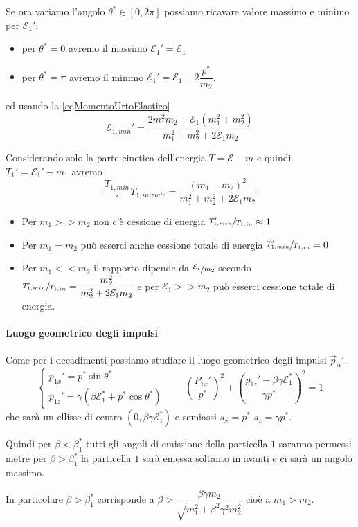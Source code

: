 \documentclass[12pt,a4paper,titlepage, twoside, openright]{book}
\numberwithin{equation}{chapter}
\begin{document}
Se ora variamo l'angolo $\theta^*\in[0,2\pi]$ possiamo ricavare valore massimo e minimo per $\mathcal{E}_1'$:\begin{itemize} \item per $\theta^*=0$ avremo il massimo $\mathcal{E}_1'=\mathcal{E}_1$ \item per $\theta^*=\pi$ avremo il minimo $\mathcal{E}_1'=\mathcal{E}_1-2\dfrac{p^*}{m_2}$.
\end{itemize}
ed usando la \eqref{eqMomentoUrtoElastico} 
\[
\mathcal{E}_{1,min}'=\dfrac{2m_1^2m_2+\mathcal{E}_1(m_1^2+m_2^2)}{m_1^2+m_2^2+2\mathcal{E}_1m_2}
\]

Considerando solo la parte cinetica dell'energia $T=\mathcal{E}-m$ e quindi $T_1'=\mathcal{E}_1'-m_1$ avremo
\[
\dfrac{T_{1,min}}'{T_{1,iniziale}}=\dfrac{(m_1-m_2)^2}{m_1^2+m_2^2+2\mathcal{E}_1m_2}
\]
\begin{itemize}
\item Per $m_1>>m_2$ non c'è cessione di energia $\sfrac{T_{1,min}'}{T_{1,in}}\approx 1$ 
\item Per $m_1=m_2$ può esserci anche cessione totale di energia $\sfrac{T_{1,min}'}{T_{1,in}}=0$
\item Per $m_1<<m_2$ il rapporto dipende da $\sfrac{\mathcal{E}_1}{m_2}$ secondo  $\sfrac{T_{1,min}'}{T_{1,in}}=\dfrac{m_2^2}{m_2^2+2\mathcal{E}_1m_2}$ e per $\mathcal{E}_1>>m_2$ può esserci cessione totale di energia.
\end{itemize}

\paragraph{Luogo geometrico degli impulsi}
Come per i decadimenti possiamo studiare il luogo geometrico degli impulsi $\vec{p}_\alpha'$.
\[
\begin{cases} p_{1x}'=p^*\sin{\theta^*} \\ p_{1z}'=\gamma\left( \beta\mathcal{E}_1^*+p^*\cos{\theta^*} \right)
\end{cases} \qquad \left(\dfrac{P_{1x}'}{p^*}\right)^2+\left(\dfrac{p_{1z}'-\beta\gamma\mathcal{E}_1^*}{\gamma p^*}\right)^2 =1
\] 
che sarà un ellisse di centro $(0,\beta\gamma\mathcal{E}_1^*)$ e semiassi $s_x=p^*$ $s_z=\gamma p^*$.

Quindi per $\beta<\beta_1^*$ tutti gli angoli di emissione della particella $1$ saranno permessi metre per $\beta>\beta_1^*$ la particella $1$ sarà emessa soltanto in avanti e ci sarà un angolo massimo.

In particolare $\beta>\beta_1^*$ corrisponde a $\beta>\dfrac{\beta\gamma m_2}{\sqrt{m_1^2+\beta^2\gamma^2m_2^2}}$ cioè a $m_1>m_2$.
\end{document}
